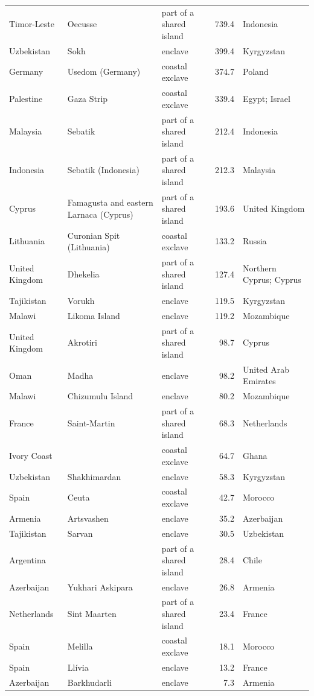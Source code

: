 \documentclass[11pt,a4paper]{article}
\begin{document}
{\begin{longtable}{p{2.6cm}p{4.4cm}p{2.6cm}rp{3.4cm}}
Timor-Leste & Oecusse & part of a shared island & 739.4 & Indonesia\\
Uzbekistan & Sokh & enclave & 399.4 & Kyrgyzstan\\
Germany & Usedom (Germany) & coastal exclave & 374.7 & Poland\\
Palestine & Gaza Strip & coastal exclave & 339.4 & Egypt; Israel\\
Malaysia & Sebatik & part of a shared island & 212.4 & Indonesia\\
Indonesia & Sebatik (Indonesia) & part of a shared island & 212.3 & Malaysia\\
Cyprus & Famagusta and eastern Larnaca (Cyprus) & part of a shared island & 193.6 & United Kingdom\\
Lithuania & Curonian Spit (Lithuania) & coastal exclave & 133.2 & Russia\\
United Kingdom & Dhekelia & part of a shared island & 127.4 & Northern Cyprus; Cyprus\\
Tajikistan & Vorukh & enclave & 119.5 & Kyrgyzstan\\
Malawi & Likoma Island & enclave & 119.2 & Mozambique\\
United Kingdom & Akrotiri & part of a shared island & 98.7 & Cyprus\\
Oman & Madha & enclave & 98.2 & United Arab Emirates\\
Malawi & Chizumulu Island & enclave & 80.2 & Mozambique\\
France & Saint-Martin & part of a shared island & 68.3 & Netherlands\\
Ivory Coast &  & coastal exclave & 64.7 & Ghana\\
Uzbekistan & Shakhimardan & enclave & 58.3 & Kyrgyzstan\\
Spain & Ceuta & coastal exclave & 42.7 & Morocco\\
Armenia & Artsvashen & enclave & 35.2 & Azerbaijan\\
Tajikistan & Sarvan & enclave & 30.5 & Uzbekistan\\
Argentina &  & part of a shared island & 28.4 & Chile\\
Azerbaijan & Yukhari Askipara & enclave & 26.8 & Armenia\\
Netherlands & Sint Maarten & part of a shared island & 23.4 & France\\
Spain & Melilla & coastal exclave & 18.1 & Morocco\\
Spain & Llívia & enclave & 13.2 & France\\
Azerbaijan & Barkhudarli & enclave & 7.3 & Armenia\\

\end{longtable}}
\end{document}
